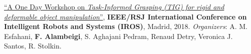 \begin{cvskills}
  \cvskill 
  {} %
    {   	\href{https://www.birmingham.ac.uk/research/activity/metallurgy-materials/robotics/workshops/task-informed-grasping-objects-manipulation.aspx}	{ “A One Day Workshop on \textit{Task-Informed Grasping (TIG) for rigid and deformable object manipulation}”}, \textbf{IEEE/RSJ International Conference on Intelligent Robots and Systems (IROS)}, Madrid, 2018. \textit{Organizers}: A. M. Esfahani, \textbf{F. Alambeigi}, S. Aghajani Pedram, Renaud Detry, Veronica J. Santos, R. Stolkin. 
    	} %
 \end{cvskills}
